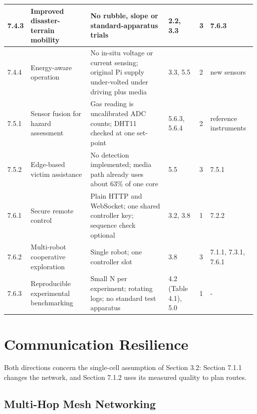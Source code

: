 \begin{center}
\begin{longtable}{|l|p{3.5cm}|p{3.5cm}|p{1.5cm}|l|p{2cm}|}
\hline
7.4.3 & Improved disaster-terrain mobility & No rubble, slope or standard-apparatus trials & 2.2, 3.3 & 3 & 7.6.3 \\
\hline
7.4.4 & Energy-aware operation & No in-situ voltage or current sensing; original Pi supply under-volted under driving plus media & 3.3, 5.5 & 2 & new sensors \\
\hline
7.5.1 & Sensor fusion for hazard assessment & Gas reading is uncalibrated ADC counts; DHT11 checked at one set-point & 5.6.3, 5.6.4 & 2 & reference instruments \\
\hline
7.5.2 & Edge-based victim assistance & No detection implemented; media path already uses about 63\% of one core & 5.5 & 3 & 7.5.1 \\
\hline
7.6.1 & Secure remote control & Plain HTTP and WebSocket; one shared controller key; sequence check optional & 3.2, 3.8 & 1 & 7.2.2 \\
\hline
7.6.2 & Multi-robot cooperative exploration & Single robot; one controller slot & 3.8 & 3 & 7.1.1, 7.3.1, 7.6.1 \\
\hline
7.6.3 & Reproducible experimental benchmarking & Small N per experiment; rotating logs; no standard test apparatus & 4.2 (Table 4.1), 5.0 & 1 & - \\
\hline
\end{longtable}
\end{center}

\section{Communication Resilience}

Both directions concern the single-cell assumption of Section 3.2: Section 7.1.1 changes the network, and Section 7.1.2 uses its measured quality to plan routes.

\subsection{Multi-Hop Mesh Networking}

